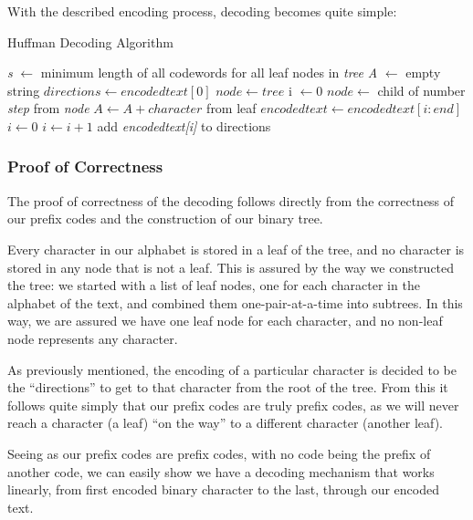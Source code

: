 \documentclass[paper=a4, fontsize=10pt]{article} %
\numberwithin{equation}{section} %
\numberwithin{figure}{section} %
\numberwithin{table}{section} %
\begin{document}
With the described encoding process, decoding becomes quite simple:

\pagebreak

\begin{algorithm}[h]
\caption{Huffman Decoding Algorithm}\label{alg:dec}
\begin{algorithmic}[1]
\State \textit{s} $\gets$ minimum length of all codewords for all leaf nodes in \textit{tree}
\State \textit{A} $\gets$ empty string
\State $directions \gets encodedtext[0]$
\State $node \gets tree$
\State i $\gets 0$
\State $node \gets$ child of number \textit{step} from \textit{node}
\State $A \gets A + character$ from leaf
\State $encodedtext \gets encodedtext[i : end]$
\State $i \gets 0$
\Else
\State $i \gets i + 1$
\State add \textit{encodedtext[i]} to directions
\EndIf
\EndFor
\EndWhile
{}
\EndProcedure
\end{algorithmic}
\end{algorithm}

\subsubsection{Proof of Correctness}

The proof of correctness of the decoding follows directly from the correctness of our prefix codes and the construction of our binary tree.


Every character in our alphabet is stored in a leaf of the tree, and no character is stored in any node that is not a leaf. This is assured by the way we constructed the tree: we started with a list of leaf nodes, one for each character in the alphabet of the text, and combined them one-pair-at-a-time into subtrees. In this way, we are assured we have one leaf node for each character, and no non-leaf node represents any character.

As previously mentioned, the encoding of a particular character is decided to be the ``directions'' to get to that character from the root of the tree. From this it follows quite simply that our prefix codes are truly prefix codes, as we will never reach a character (a leaf) ``on the way'' to a different character (another leaf).

Seeing as our prefix codes are prefix codes, with no code being the prefix of another code, we can easily show we have a decoding mechanism that works linearly, from first encoded binary character to the last, through our encoded text.
\end{document}
